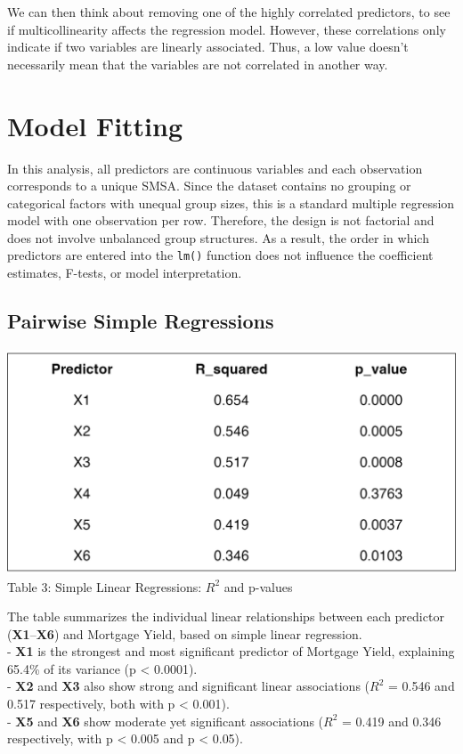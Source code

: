 \documentclass[
  11pt,
]{article}
\begin{document}
We can then think about removing one of the highly correlated
predictors, to see if multicollinearity affects the regression model.
However, these correlations only indicate if two variables are linearly
associated. Thus, a low value doesn't necessarily mean that the
variables are not correlated in another way.

\section{Model Fitting}\label{model-fitting}

In this analysis, all predictors are continuous variables and each
observation corresponds to a unique SMSA. Since the dataset contains no
grouping or categorical factors with unequal group sizes, this is a
standard multiple regression model with one observation per row.
Therefore, the design is not factorial and does not involve unbalanced
group structures. As a result, the order in which predictors are entered
into the \texttt{lm()} function does not influence the coefficient
estimates, F-tests, or model interpretation.

\subsection{Pairwise Simple
Regressions}\label{pairwise-simple-regressions}

\begin{minipage}{0.5\textwidth}
\includegraphics[width=\linewidth]{simple_regression_table.png}\\
\small Table 3: Simple Linear Regressions: $R^2$ and p-values
\end{minipage}
\hspace{1em}
\begin{minipage}{0.52\textwidth}
\small
The table summarizes the individual linear relationships between each predictor (\textbf{X1}–\textbf{X6}) and Mortgage Yield, based on simple linear regression.\\
- \textbf{X1} is the strongest and most significant predictor of Mortgage Yield, explaining 65.4\% of its variance (p < 0.0001). \\
- \textbf{X2} and \textbf{X3} also show strong and significant linear associations ($R^2$ = 0.546 and 0.517 respectively, both with p < 0.001).\\
- \textbf{X5} and \textbf{X6} show moderate yet significant associations ($R^2$ = 0.419 and 0.346 respectively, with p < 0.005 and p < 0.05).
\end{minipage}
\addtocounter{table}{1}
\end{document}
